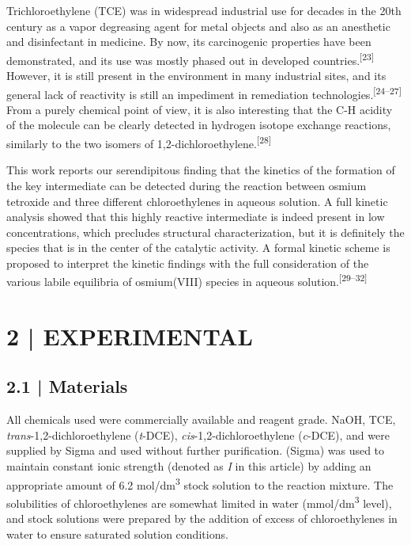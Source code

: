 \documentclass{article}
\begin{document}
Trichloroethylene (TCE) was in widespread industrial use for decades in the 20th century as a vapor degreasing agent for metal objects and also as an anesthetic and disinfectant in medicine. By now, its carcinogenic properties have been demonstrated, and its use was mostly phased out in developed countries.\textsuperscript{[23]} However, it is still present in the environment in many industrial sites, and its general lack of reactivity is still an impediment in remediation technologies.\textsuperscript{[24–27]} From a purely chemical point of view, it is also interesting that the C-H acidity of the molecule can be clearly detected in hydrogen isotope exchange reactions, similarly to the two isomers of 1,2-dichloroethylene.\textsuperscript{[28]}

This work reports our serendipitous finding that the kinetics of the formation of the key intermediate can be detected during the reaction between osmium tetroxide and three different chloroethylenes in aqueous solution. A full kinetic analysis showed that this highly reactive intermediate is indeed present in low concentrations, which precludes structural characterization, but it is definitely the species that is in the center of the catalytic activity. A formal kinetic scheme is proposed to interpret the kinetic findings with the full consideration of the various labile equilibria of osmium(VIII) species in aqueous solution.\textsuperscript{[29–32]}

\section*{2 \quad | \quad EXPERIMENTAL}

\subsection*{2.1 \quad | \quad Materials}

All chemicals used were commercially available and reagent grade. NaOH, TCE, \emph{trans}-1,2-dichloroethylene (\emph{t}-DCE), \emph{cis}-1,2-dichloroethylene (\emph{c}-DCE), and  were supplied by Sigma and used without further purification.  (Sigma) was used to maintain constant ionic strength (denoted as \emph{I} in this article) by adding an appropriate amount of 6.2 mol/dm\textsuperscript{3} stock solution to the reaction mixture. The solubilities of chloroethylenes are somewhat limited in water (mmol/dm\textsuperscript{3} level), and stock solutions were prepared by the addition of excess of chloroethylenes in water to ensure saturated solution conditions.
\end{document}
